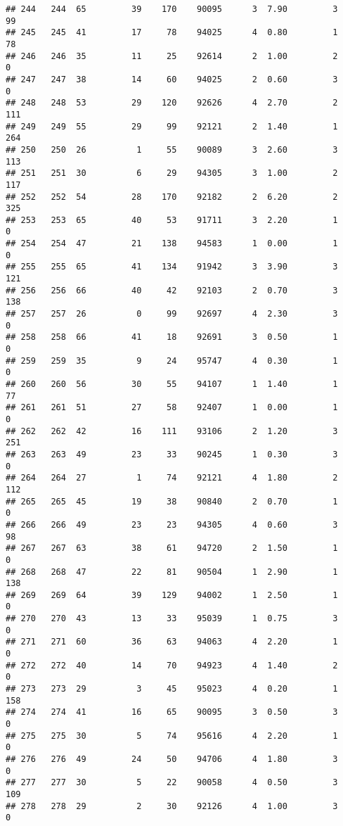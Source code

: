 \documentclass[
]{article}
\begin{document}
\begin{verbatim}
## 244   244  65         39    170    90095      3  7.90         3       99
## 245   245  41         17     78    94025      4  0.80         1       78
## 246   246  35         11     25    92614      2  1.00         2        0
## 247   247  38         14     60    94025      2  0.60         3        0
## 248   248  53         29    120    92626      4  2.70         2      111
## 249   249  55         29     99    92121      2  1.40         1      264
## 250   250  26          1     55    90089      3  2.60         3      113
## 251   251  30          6     29    94305      3  1.00         2      117
## 252   252  54         28    170    92182      2  6.20         2      325
## 253   253  65         40     53    91711      3  2.20         1        0
## 254   254  47         21    138    94583      1  0.00         1        0
## 255   255  65         41    134    91942      3  3.90         3      121
## 256   256  66         40     42    92103      2  0.70         3      138
## 257   257  26          0     99    92697      4  2.30         3        0
## 258   258  66         41     18    92691      3  0.50         1        0
## 259   259  35          9     24    95747      4  0.30         1        0
## 260   260  56         30     55    94107      1  1.40         1       77
## 261   261  51         27     58    92407      1  0.00         1        0
## 262   262  42         16    111    93106      2  1.20         3      251
## 263   263  49         23     33    90245      1  0.30         3        0
## 264   264  27          1     74    92121      4  1.80         2      112
## 265   265  45         19     38    90840      2  0.70         1        0
## 266   266  49         23     23    94305      4  0.60         3       98
## 267   267  63         38     61    94720      2  1.50         1        0
## 268   268  47         22     81    90504      1  2.90         1      138
## 269   269  64         39    129    94002      1  2.50         1        0
## 270   270  43         13     33    95039      1  0.75         3        0
## 271   271  60         36     63    94063      4  2.20         1        0
## 272   272  40         14     70    94923      4  1.40         2        0
## 273   273  29          3     45    95023      4  0.20         1      158
## 274   274  41         16     65    90095      3  0.50         3        0
## 275   275  30          5     74    95616      4  2.20         1        0
## 276   276  49         24     50    94706      4  1.80         3        0
## 277   277  30          5     22    90058      4  0.50         3      109
## 278   278  29          2     30    92126      4  1.00         3        0

\end{verbatim}
\end{document}
